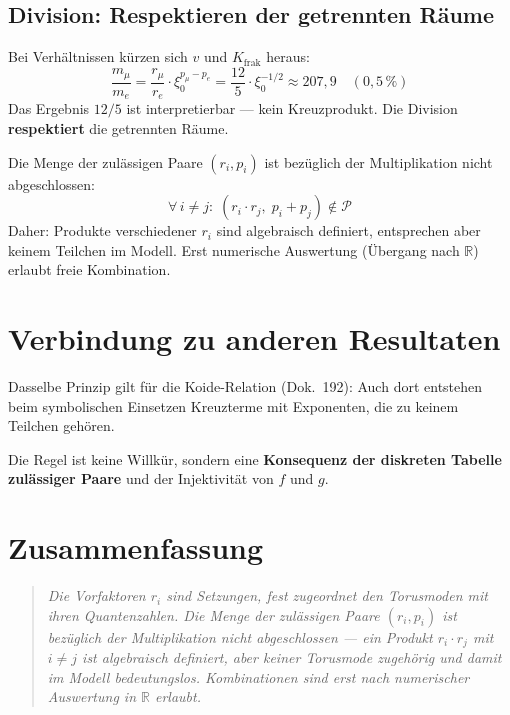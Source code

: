 \subsection{Division: Respektieren der getrennten Räume}

Bei Verhältnissen kürzen sich $v$ und $K_{\text{frak}}$ heraus:
\[
  \frac{m_\mu}{m_e}
  = \frac{r_\mu}{r_e} \cdot \xi_0^{p_\mu - p_e}
  = \frac{12}{5} \cdot \xi_0^{-1/2}
  \approx 207{,}9 \quad (0{,}5\,\%)
\]
Das Ergebnis $12/5$ ist interpretierbar --- kein Kreuzprodukt.
Die Division \textbf{respektiert} die getrennten Räume.

\begin{tcolorbox}[colback=blue!5, colframe=blue!60!black, boxrule=0.5pt,
  arc=2pt, left=3mm, right=3mm, fontupper=\small,
  title={Grundregel --- Die Nichtabschluss-Bedingung}]
Die Menge der zulässigen Paare $(r_i, p_i)$ ist bezüglich der
Multiplikation nicht abgeschlossen:
\[
  \boxed{\forall\, i \neq j:\; (r_i \cdot r_j,\; p_i + p_j) \notin \mathcal{P}}
\]
Daher: Produkte verschiedener $r_i$ sind algebraisch definiert,
entsprechen aber keinem Teilchen im Modell.
Erst numerische Auswertung (Übergang nach $\mathbb{R}$) erlaubt
freie Kombination.
\end{tcolorbox}

\section{Verbindung zu anderen Resultaten}

Dasselbe Prinzip gilt für die Koide-Relation (Dok.~192):
Auch dort entstehen beim symbolischen Einsetzen Kreuzterme mit
Exponenten, die zu keinem Teilchen gehören.

Die Regel ist keine Willkür, sondern eine \textbf{Konsequenz
der diskreten Tabelle zulässiger Paare} und der Injektivität von
$f$ und $g$.

\section*{Zusammenfassung}

\begin{quote}
\emph{Die Vorfaktoren $r_i$ sind Setzungen, fest zugeordnet
den Torusmoden mit ihren Quantenzahlen.
Die Menge der zulässigen Paare $(r_i, p_i)$ ist bezüglich der
Multiplikation nicht abgeschlossen --- ein Produkt $r_i \cdot r_j$
mit $i \neq j$ ist algebraisch definiert, aber keiner Torusmode zugehörig
und damit im Modell bedeutungslos. Kombinationen sind erst nach
numerischer Auswertung in $\mathbb{R}$ erlaubt.}
\end{quote}

